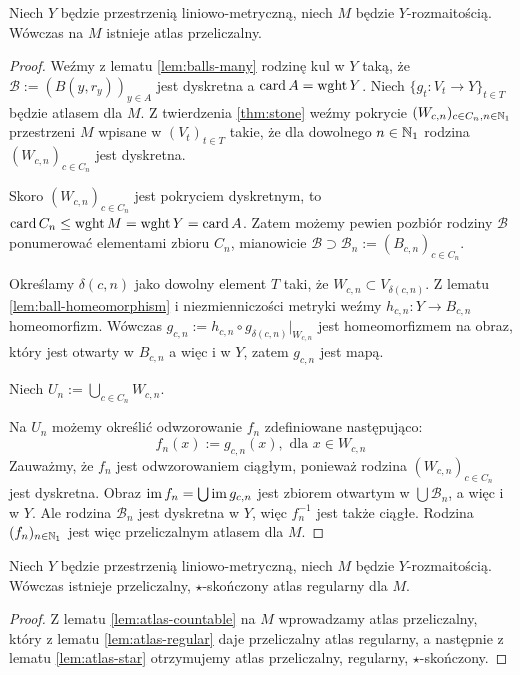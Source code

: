 \begin{lem} \label{lem:atlas-countable}
  Niech $Y$ będzie przestrzenią liniowo-metryczną, niech $M$ będzie $Y$-rozmaitością. Wówczas na $M$ istnieje atlas przeliczalny.
  \begin{proof}
    Weźmy z lematu \ref{lem:balls-many} rodzinę kul w $Y$ taką, że $\mathcal B := (B(y,r_y))_{y\in A}$ jest dyskretna a $\operatorname{card} A = \operatorname{wght} Y$.
    Niech $\{g_t: V_t \to Y\}_{t \in T}$ będzie atlasem dla $M$.
    Z twierdzenia \ref{thm:stone} weźmy pokrycie $(W_{c,n})_{c \in C_n, n \in \mathbb{N}_1}$ przestrzeni $M$ wpisane w $(V_t)_{t \in T}$ takie, że dla dowolnego $n \in \mathbb{N}_1$ rodzina $(W_{c,n})_{c \in C_n}$ jest dyskretna.
    
    Skoro $(W_{c,n})_{c \in C_n}$ jest pokryciem dyskretnym, to $\operatorname{card} C_n \leq \operatorname{wght} M = \operatorname{wght} Y = \operatorname{card} A$.
    Zatem możemy pewien pozbiór rodziny $\mathcal B$ ponumerować elementami zbioru $C_n$, mianowicie $\mathcal B \supset \mathcal B_n := (B_{c,n})_{c \in C_n}$.
    
    Określamy $\delta(c,n)$ jako dowolny element $T$ taki, że $W_{c,n} \subset V_{\delta(c,n)}$. Z lematu \ref{lem:ball-homeomorphism} i niezmienniczości metryki weźmy $h_{c,n}: Y \to B_{c,n}$ homeomorfizm. Wówczas $g_{c,n} := h_{c,n} \circ g_{\delta(c,n)}|_{W_{c,n}}$ jest homeomorfizmem na obraz, który jest otwarty w $B_{c,n}$ a więc i w $Y$, zatem $g_{c,n}$ jest mapą.
    
    Niech $U_n := \bigcup_{c \in C_n} W_{c,n}$.
    
    Na $U_n$ możemy określić odwzorowanie $f_n$ zdefiniowane następująco:
    \[
      f_n(x) := g_{c,n}(x),\mbox{ dla }x\in W_{c,n}
    \]
    Zauważmy, że $f_n$ jest odwzorowaniem ciągłym, ponieważ rodzina $(W_{c,n})_{c \in C_n}$ jest dyskretna. Obraz $\operatorname{im} f_n = \bigcup \operatorname{im} g_{c,n}$ jest zbiorem otwartym w $\bigcup \mathcal B_n$, a więc i w $Y$. Ale rodzina $\mathcal B_n$ jest dyskretna w $Y$, więc $f_n^{-1}$ jest także ciągłe.
    Rodzina $(f_n)_{n \in \mathbb{N}_1}$ jest więc przeliczalnym atlasem dla $M$.
  \end{proof}
\end{lem}

\begin{thm} \label{thm:super-atlas}
  Niech $Y$ będzie przestrzenią liniowo-metryczną, niech $M$ będzie $Y$-rozmaitością. Wówczas istnieje przeliczalny, $\star$-skończony atlas regularny dla $M$.
  \begin{proof}
    Z lematu \ref{lem:atlas-countable} na $M$ wprowadzamy atlas przeliczalny, który z lematu \ref{lem:atlas-regular} daje przeliczalny atlas regularny, a następnie z lematu \ref{lem:atlas-star} otrzymujemy atlas przeliczalny, regularny, $\star$-skończony.
  \end{proof}
\end{thm}